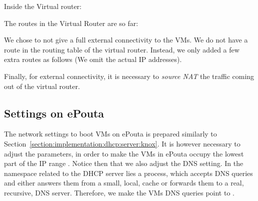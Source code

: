 
Inside the Virtual router:


The routes in the Virtual Router are so far:


We chose to not give a full external connectivity to the VMs. We do
not have a  route in the routing table of the virtual
router. Instead, we only added a few extra routes as follows (We omit
the actual IP addresses).


Finally, for external connectivity, it is necessary to \emph{source
  NAT} the traffic coming out of the virtual router.


\subsection{Settings on ePouta}
\label{section:implementation:epouta}

The network settings to boot VMs on ePouta is prepared similarly to
Section~\ref{section:implementation:dhcp:server:knox}.
%
It is however necessary to adjust the parameters, in order to make the
VMs in ePouta occupy the lowest part of the IP range
.
%
Notice then that we also adjust the DNS setting. In the namespace
related to the DHCP server lies a  process, which accepts
DNS queries and either answers them from a small, local, cache or
forwards them to a real, recursive, DNS server. Therefore, we make the
VMs DNS queries point to .


